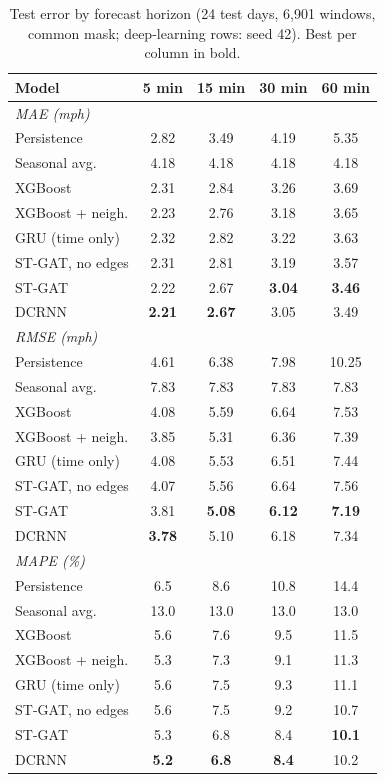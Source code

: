 \begin{table}[t]
\centering
\caption{Test error by forecast horizon (24 test days, 6{,}901 windows, common mask; deep-learning rows: seed 42). Best per column in bold.}
\label{tab:main}
\setlength{\tabcolsep}{5pt}
\begin{tabular}{@{}lcccc@{}}
\toprule
Model & 5 min & 15 min & 30 min & 60 min \\
\midrule
\multicolumn{5}{l}{\textit{MAE (mph)}}\\
Persistence & 2.82 & 3.49 & 4.19 & 5.35 \\
Seasonal avg. & 4.18 & 4.18 & 4.18 & 4.18 \\
XGBoost & 2.31 & 2.84 & 3.26 & 3.69 \\
XGBoost + neigh. & 2.23 & 2.76 & 3.18 & 3.65 \\
GRU (time only) & 2.32 & 2.82 & 3.22 & 3.63 \\
ST-GAT, no edges & 2.31 & 2.81 & 3.19 & 3.57 \\
ST-GAT & 2.22 & 2.67 & \textbf{3.04} & \textbf{3.46} \\
DCRNN & \textbf{2.21} & \textbf{2.67} & 3.05 & 3.49 \\
\midrule
\multicolumn{5}{l}{\textit{RMSE (mph)}}\\
Persistence & 4.61 & 6.38 & 7.98 & 10.25 \\
Seasonal avg. & 7.83 & 7.83 & 7.83 & 7.83 \\
XGBoost & 4.08 & 5.59 & 6.64 & 7.53 \\
XGBoost + neigh. & 3.85 & 5.31 & 6.36 & 7.39 \\
GRU (time only) & 4.08 & 5.53 & 6.51 & 7.44 \\
ST-GAT, no edges & 4.07 & 5.56 & 6.64 & 7.56 \\
ST-GAT & 3.81 & \textbf{5.08} & \textbf{6.12} & \textbf{7.19} \\
DCRNN & \textbf{3.78} & 5.10 & 6.18 & 7.34 \\
\midrule
\multicolumn{5}{l}{\textit{MAPE (\%)}}\\
Persistence & 6.5 & 8.6 & 10.8 & 14.4 \\
Seasonal avg. & 13.0 & 13.0 & 13.0 & 13.0 \\
XGBoost & 5.6 & 7.6 & 9.5 & 11.5 \\
XGBoost + neigh. & 5.3 & 7.3 & 9.1 & 11.3 \\
GRU (time only) & 5.6 & 7.5 & 9.3 & 11.1 \\
ST-GAT, no edges & 5.6 & 7.5 & 9.2 & 10.7 \\
ST-GAT & 5.3 & 6.8 & 8.4 & \textbf{10.1} \\
DCRNN & \textbf{5.2} & \textbf{6.8} & \textbf{8.4} & 10.2 \\
\bottomrule
\end{tabular}
\end{table}
